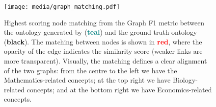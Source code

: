 \begin{landscape}
    \centering
    \begin{figure}[t]
        \vspace*{-1.2cm}
        \centering
        \texttt{[image: media/graph\_matching.pdf]}
        \caption{Highest scoring node matching from the Graph F1 metric between the ontology generated by \name (\textcolor{teal}{\textbf{teal}}) and the ground truth ontology (\textbf{black}). The matching between nodes is shown in \textcolor{red}{\textbf{red}}, where the opacity of the edge indicates the similarity score (weaker links are more transparent). Visually, the matching defines a clear alignment of the two graphs: from the centre to the left we have the Mathematics-related concepts; at the top right we have Biology-related concepts; and at the bottom right we have Economics-related concepts.}
        \label{fig:graph-matching}
    \end{figure}
\end{landscape}